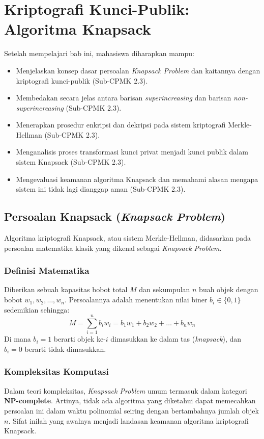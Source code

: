 \documentclass[../main.tex]{subfiles}
\begin{document}
\chapter{Kriptografi Kunci-Publik: Algoritma Knapsack}

\begin{learningoutcome}
Setelah mempelajari bab ini, mahasiswa diharapkan mampu:
\begin{itemize}
    \item Menjelaskan konsep dasar persoalan \textit{Knapsack Problem} dan kaitannya dengan kriptografi kunci-publik (Sub-CPMK 2.3).
    \item Membedakan secara jelas antara barisan \textit{superincreasing} dan barisan \textit{non-superincreasing} (Sub-CPMK 2.3).
    \item Menerapkan prosedur enkripsi dan dekripsi pada sistem kriptografi Merkle-Hellman (Sub-CPMK 2.3).
    \item Menganalisis proses transformasi kunci privat menjadi kunci publik dalam sistem Knapsack (Sub-CPMK 2.3).
    \item Mengevaluasi keamanan algoritma Knapsack dan memahami alasan mengapa sistem ini tidak lagi dianggap aman (Sub-CPMK 2.3).
\end{itemize}
\end{learningoutcome}

\section{Persoalan Knapsack (\textit{Knapsack Problem})}
Algoritma kriptografi Knapsack, atau sistem Merkle-Hellman, didasarkan pada persoalan matematika klasik yang dikenal sebagai \textit{Knapsack Problem}.

\subsection{Definisi Matematika}
Diberikan sebuah kapasitas bobot total $M$ dan sekumpulan $n$ buah objek dengan bobot $w_1, w_2, \dots, w_n$. Persoalannya adalah menentukan nilai biner $b_i \in \{0, 1\}$ sedemikian sehingga:
\[ M = \sum_{i=1}^{n} b_i w_i = b_1w_1 + b_2w_2 + \dots + b_nw_n \]
Di mana $b_i = 1$ berarti objek ke-$i$ dimasukkan ke dalam tas (\textit{knapsack}), dan $b_i = 0$ berarti tidak dimasukkan.

\subsection{Kompleksitas Komputasi}
Dalam teori kompleksitas, \textit{Knapsack Problem} umum termasuk dalam kategori \textbf{NP-complete}. Artinya, tidak ada algoritma yang diketahui dapat memecahkan persoalan ini dalam waktu polinomial seiring dengan bertambahnya jumlah objek $n$. Sifat inilah yang awalnya menjadi landasan keamanan algoritma kriptografi Knapsack.
\end{document}
